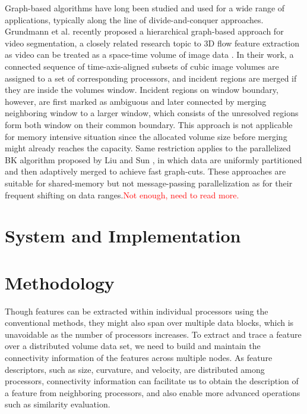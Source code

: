 \documentclass[10pt, conference, compsocconf]{IEEEtran}
\begin{document}
Graph-based algorithms have long been studied and used for a wide range of applications, typically along the line of divide-and-conquer approaches.
Grundmann et al. \cite{Grundmann2010} recently proposed a hierarchical graph-based approach for video segmentation, a closely related research topic to 3D flow feature extraction as video can be treated as a space-time volume of image data \cite{Klein2002}. In their work, a connected sequence of time-axis-aligned subsets of cubic image volumes are assigned to a set of corresponding processors, and incident regions are merged if they are inside the volumes window. Incident regions on window boundary, however, are first marked as ambiguous and later connected by merging neighboring window to a larger window, which consists of the unresolved regions form both window on their common boundary. This approach is not applicable for memory intensive situation since the allocated volume size before merging might already reaches the capacity. Same restriction applies to the parallelized BK algorithm \cite{Boykov2004} proposed by Liu and Sun \cite{Liu2010}, in which data are uniformly partitioned and then adaptively merged to achieve fast graph-cuts. These approaches are suitable for shared-memory but not message-passing parallelization as for their frequent shifting on data ranges.\textcolor{red}{Not enough, need to read more.}

\section{System and Implementation}

\section{Methodology}

Though features can be extracted within individual processors using the conventional methods, they might also span over multiple data blocks, which is unavoidable as the number of processors increases. To extract and trace a feature over a distributed volume data set, we need to build and maintain the connectivity information of the features across multiple nodes. As feature descriptors, such as size, curvature, and velocity, are distributed among processors, connectivity information can facilitate us to obtain the description of a feature from neighboring processors, and also enable more advanced operations such as similarity evaluation.
\end{document}
